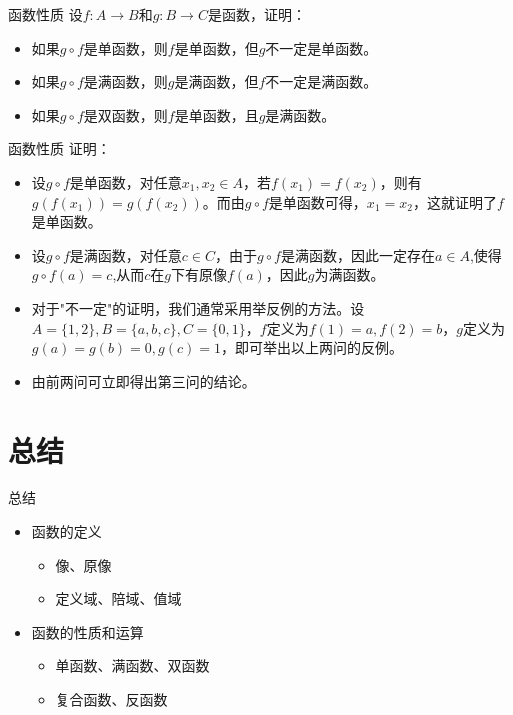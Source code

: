 \documentclass[xetex,10pt,aspectratio=43]{beamer}
\begin{document}
\begin{frame}{函数性质}
	设$f:A\rightarrow B$和$g:B\rightarrow C$是函数，证明：
	\begin{itemize}
		\item<1-> 如果$g\circ f$是单函数，则$f$是单函数，但$g$不一定是单函数。
		\item<1-> 如果$g\circ f$是满函数，则$g$是满函数，但$f$不一定是满函数。
		\item<1-> 如果$g\circ f$是双函数，则$f$是单函数，且$g$是满函数。
	\end{itemize}
\end{frame}

\begin{frame}{函数性质}
	证明：
	\begin{itemize}
		\item<1-> 设$g\circ f$是单函数，对任意$x_{1},x_{2}\in A$，若$f(x_{1})=f(x_{2})$，则有$g(f(x_{1}))=g(f(x_{2}))$。而由$g\circ f$是单函数可得，$x_{1}=x_{2}$，这就证明了$f$是单函数。
		\item<2-> 设$g\circ f$是满函数，对任意$c\in C$，由于$g\circ f$是满函数，因此一定存在$a\in A$,使得$g\circ f(a)=c$,从而$c$在$g$下有原像$f(a)$，因此$g$为满函数。
		\item<3-> 对于"不一定"的证明，我们通常采用举反例的方法。设$A=\{1,2\},B=\{a,b,c\},C=\{0,1\}$，$f$定义为$f(1)=a,f(2)=b$，$g$定义为$g(a)=g(b)=0,g(c)=1$，即可举出以上两问的反例。
		\item<4-> 由前两问可立即得出第三问的结论。
	\end{itemize}
\end{frame}

\section{总结}

\begin{frame}{总结}
	\begin{itemize}
		\item<1-> 函数的定义
		\begin{itemize}
			\item<1-> 像、原像
			\item<1-> 定义域、陪域、值域
		\end{itemize}
		\item <1-> 函数的性质和运算
		\begin{itemize}
			\item<1-> 单函数、满函数、双函数
			\item<1-> 复合函数、反函数
		\end{itemize}
	\end{itemize}
\end{frame}
\end{document}
